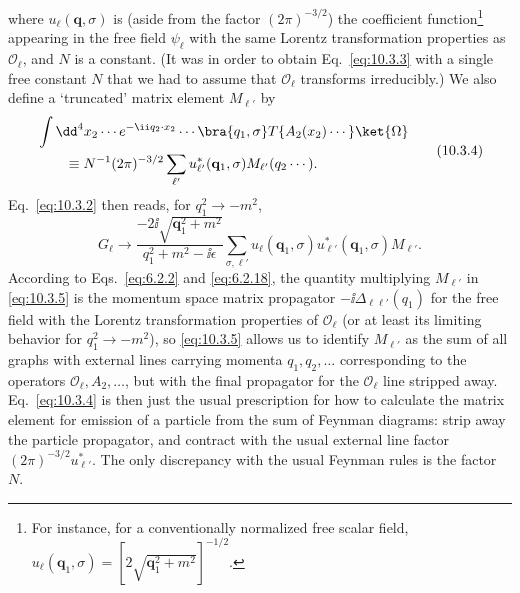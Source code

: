where $u_\ell(\mathbf q,\sigma)$ is (aside from the factor $(2\pi)^{-3/2}$)
the coefficient function\footnote{For instance, for a conventionally
normalized free scalar field,
$u_\ell(\mathbf q_1,\sigma)=[2\sqrt{\mathbf q_1^2+m^2}]^{-1/2}$.}
appearing in the free field $\psi_\ell$ with the same Lorentz transformation
properties as $\mathcal O_\ell$, and $N$ is a constant. (It was in order to
obtain Eq.~\eqref{eq:10.3.3} with a single free constant $N$ that we had to
assume that $\mathcal O_\ell$ transforms irreducibly.) We also define a
`truncated' matrix element $M_{\ell'}$ by
\begin{equation}
\begin{split}
&\int \dd^4x_2\cdots e^{-\ii q_2\cdot x_2}\cdots
\bra{q_1,\sigma}T\{A_2(x_2)\cdots\}\ket{\Omega}
\\
&\qquad\equiv N^{-1}(2\pi)^{-3/2}
\sum_{\ell'}u_{\ell'}^*(\mathbf q_1,\sigma)M_{\ell'}(q_2\cdots).
\end{split}
\tag{10.3.4}\label{eq:10.3.4}
\end{equation}
Eq.~\eqref{eq:10.3.2} then reads, for $q_1^2\to-m^2$,
\begin{equation}
G_\ell\to
\frac{-2\ii\sqrt{\mathbf q_1^2+m^2}}{q_1^2+m^2-\ii\epsilon}
\sum_{\sigma,\ell'}u_\ell(\mathbf q_1,\sigma)
u_{\ell'}^*(\mathbf q_1,\sigma)M_{\ell'}.
\tag{10.3.5}\label{eq:10.3.5}
\end{equation}
According to Eqs.~\eqref{eq:6.2.2} and \eqref{eq:6.2.18}, the quantity
multiplying $M_{\ell'}$ in \eqref{eq:10.3.5} is the momentum space matrix
propagator $-\ii\Delta_{\ell\ell'}(q_1)$ for the free field with the Lorentz
transformation properties of $\mathcal O_\ell$ (or at least its limiting
behavior for $q_1^2\to-m^2$), so \eqref{eq:10.3.5} allows us to identify
$M_{\ell'}$ as the sum of all graphs with external lines carrying momenta
$q_1,q_2,\ldots$ corresponding to the operators $\mathcal O_\ell,A_2,\ldots$,
but with the final propagator for the $\mathcal O_\ell$ line stripped away.
Eq.~\eqref{eq:10.3.4} is then just the usual prescription for how to calculate
the matrix element for emission of a particle from the sum of Feynman diagrams:
strip away the particle propagator, and contract with the usual external line
factor $(2\pi)^{-3/2}u_{\ell'}^*$. The only discrepancy with the usual Feynman
rules is the factor $N$.


